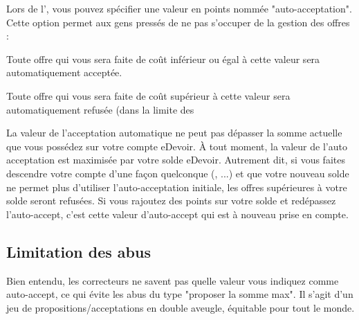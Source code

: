 Lors de l', vous pouvez spécifier une valeur en points nommée "auto-acceptation". Cette option permet aux gens pressés de ne pas s'occuper de la gestion des offres :
\item Toute offre qui vous sera faite de coût inférieur ou égal à cette valeur sera automatiquement acceptée.
\item Toute offre qui vous sera faite de coût supérieur à cette valeur sera automatiquement refusée (dans la limite des %

La valeur de l'acceptation automatique ne peut pas dépasser la somme actuelle que vous possédez sur votre compte eDevoir.
À tout moment, la valeur de l'auto acceptation est maximisée par votre solde eDevoir.
Autrement dit, si vous faites descendre votre compte d'une façon quelconque (, ...) et que votre nouveau solde ne permet plus d'utiliser l'auto-acceptation initiale, les offres supérieures à votre solde seront refusées.
Si vous rajoutez des points sur votre solde et redépassez l'auto-accept, c'est cette valeur d'auto-accept qui est à nouveau prise en compte.

\subsection{Limitation des abus}
Bien entendu, les correcteurs ne savent pas quelle valeur vous indiquez comme auto-accept, ce qui évite les abus du type "proposer la somme max". Il s'agit d'un jeu de propositions/acceptations en double aveugle, équitable pour tout le monde.